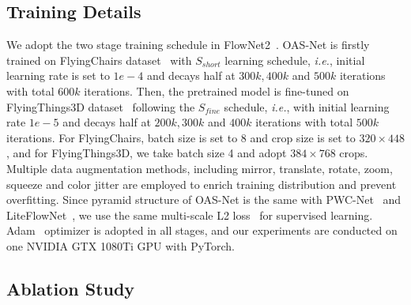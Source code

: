 \documentclass{article}
\begin{document}
\subsection{Training Details}
We adopt the two stage training schedule in FlowNet2~\cite{Ilg2017FlowNet2E}. OAS-Net is firstly trained on FlyingChairs dataset~\cite{Fischer2015FlowNetLO} with $S_{short}$ learning schedule, \textit{i.e.}, initial learning rate is set to $1e-4$ and decays half at $300k, 400k$ and $500k$ iterations with total $600k$ iterations. Then, the pretrained model is fine-tuned on FlyingThings3D dataset~\cite{MIFDB16} following the $S_{fine}$ schedule, \textit{i.e.}, with initial learning rate $1e-5$ and decays half at $200k, 300k$ and $400k$ iterations with total $500k$ iterations. For FlyingChairs, batch size is set to 8 and crop size is set to $320 \times 448$, and for FlyingThings3D, we take batch size 4 and adopt $384 \times 768$ crops. Multiple data augmentation methods, including mirror, translate, rotate, zoom, squeeze and color jitter are employed to enrich training distribution and prevent overfitting. Since pyramid structure of OAS-Net is the same with PWC-Net~\cite{Sun_2018_CVPR} and LiteFlowNet~\cite{Hui_2018_CVPR}, we use the same multi-scale L2 loss~\cite{Sun_2018_CVPR} for supervised learning. Adam~\cite{Kingma_Adam} optimizer is adopted in all stages, and our experiments are conducted on one NVIDIA GTX 1080Ti GPU with PyTorch.

\subsection{Ablation Study}
\begin{table}[!t]
	\renewcommand\arraystretch{1.0}
	\normalsize
	\caption{Ablation study of proposed modules.}
	\vspace{-1.5 em}
	\begin{center}
		\centering
	\end{center}
	\label{tab1}
	\vspace{-1.0 em}
\end{table}
\end{document}
